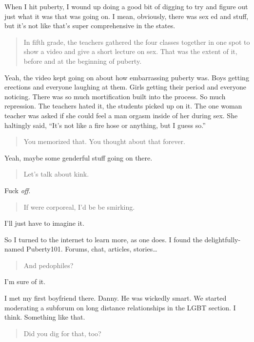 When I hit puberty, I wound up doing a good bit of digging to try and figure out just what it was that was going on. I mean, obviously, there was sex ed and stuff, but it's not like that's super comprehensive in the states.

\begin{quote}
In fifth grade, the teachers gathered the four classes together in one spot to show a video and give a short lecture on sex. That was the extent of it, before and at the beginning of puberty.
\end{quote}

Yeah, the video kept going on about how embarrassing puberty was. Boys getting erections and everyone laughing at them. Girls getting their period and everyone noticing. There was so much mortification built into the process. So much repression. The teachers hated it, the students picked up on it. The one woman teacher was asked if she could feel a man orgasm inside of her during sex. She haltingly said, ``It's not like a fire hose or anything, but I guess so.''

\begin{quote}
You memorized that. You thought about that forever.
\end{quote}

Yeah, maybe some genderful stuff going on there.

\begin{quote}
Let's talk about kink.
\end{quote}

Fuck \emph{off}.

\begin{quote}
If were corporeal, I'd be be smirking.
\end{quote}

I'll just have to imagine it.

So I turned to the internet to learn more, as one does. I found the delightfully-named Puberty101. Forums, chat, articles, stories\ldots{}

\begin{quote}
And pedophiles?
\end{quote}

I'm sure of it.

I met my first boyfriend there. Danny. He was wickedly smart. We started moderating a subforum on long distance relationships in the LGBT section. I think. Something like that.

\begin{quote}
Did you dig for that, too?
\end{quote}

